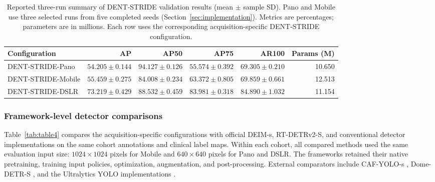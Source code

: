 \documentclass[a4paper,fleqn]{cas-dc}
\begin{document}
\begin{table}[pos=t,width=\textwidth]
\caption{Reported three-run summary of DENT-STRIDE validation results (mean $\pm$ sample SD). Pano and Mobile use three selected runs from five completed seeds (Section~\ref{sec:implementation}). Metrics are percentages; parameters are in millions. Each row uses the corresponding acquisition-specific DENT-STRIDE configuration.}
\label{tab:table3}
\centering
\footnotesize
\begin{tabular*}{\textwidth}{@{\extracolsep{\fill}}lrrrrr@{}}
\toprule
Configuration & AP & AP50 & AP75 & AR100 & Params (M) \\
\midrule
DENT-STRIDE-Pano & $54.205\pm0.144$ & $94.127\pm0.126$ & $55.574\pm0.392$ & $69.305\pm0.210$ & 10.650 \\
DENT-STRIDE-Mobile & $55.459\pm0.275$ & $84.008\pm0.234$ & $63.372\pm0.805$ & $69.859\pm0.661$ & 12.513 \\
DENT-STRIDE-DSLR & $73.219\pm0.429$ & $88.532\pm0.459$ & $83.981\pm0.318$ & $84.890\pm1.032$ & 11.154 \\
\bottomrule
\end{tabular*}
\end{table}



\subsubsection{Framework-level detector comparisons}
Table~\ref{tab:table4} compares the acquisition-specific configurations with official DEIM-s, RT-DETRv2-S, and conventional detector implementations on the same cohort annotations and clinical label maps. Within each cohort, all compared methods used the same evaluation input size: $1024\times1024$ pixels for Mobile and $640\times640$ pixels for Pano and DSLR. The frameworks retained their native pretraining, training input policies, optimization, augmentation, and post-processing. External comparators include CAF-YOLO-s \citep{chen2025caf}, Dome-DETR-S \citep{hu2025dome}, and the Ultralytics YOLO implementations \citep{jocher2023ultralytics}.
\end{document}
